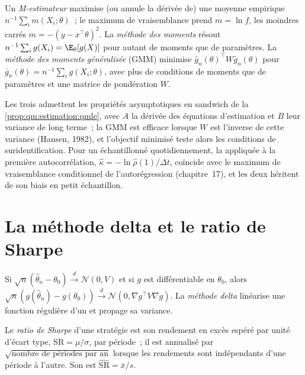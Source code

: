 \begin{definition}\label{def:qm:estimation:m}
Un \emph{M-estimateur} maximise (ou annule la dérivée de) une moyenne empirique $n^{-1}\sum_im(X_i; \theta)$~;
le maximum de vraisemblance prend $m = \ln f$, les moindres carrés $m = -(y - x^\top\theta)^2$. La \emph{méthode des
moments} résout $n^{-1}\sum_ig(X_i) = \E_\theta[g(X)]$ pour autant de moments que de paramètres. La
\emph{méthode des moments généralisée} (GMM) minimise $\bar g_n(\theta)^\top W\bar g_n(\theta)$ pour
$\bar g_n(\theta) = n^{-1}\sum_ig(X_i; \theta)$, avec plus de conditions de moments que de paramètres et une matrice de pondération $W$.
\end{definition}

Les trois admettent les propriétés asymptotiques en sandwich de la \cref{prop:qm:estimation:qmle}, avec $A$ la dérivée des équations
d'estimation et $B$ leur variance de long terme~; la GMM est efficace lorsque $W$ est l'inverse de cette variance (Hansen, 1982),
et l'objectif minimisé teste alors les conditions de suridentification. Pour un  échantillonné
quotidiennement, la  appliquée à la première autocorrélation, $\hat\kappa = -\ln\hat\rho(1)/\Delta t$, coïncide avec le
maximum de vraisemblance conditionnel de l'autorégression (chapitre~17), et les deux héritent de son biais en petit échantillon.

\section{La méthode delta et le ratio de Sharpe}

\begin{method}\label{met:qm:estimation:delta}
Si $\sqrt n(\hat\theta_n - \theta_0) \xrightarrow{d} \mathcal N(0, V)$ et si $g$ est différentiable en $\theta_0$, alors $\sqrt n(g(\hat\theta_n) - g(\theta_0))
\xrightarrow{d} \mathcal N(0, \nabla g^\top V\nabla g)$. La \emph{méthode delta} linéarise une fonction régulière d'un
 et propage sa variance.
\end{method}

\begin{definition}\label{def:qm:estimation:sharpe}
Le \emph{ratio de Sharpe} d'une stratégie est son rendement en excès espéré par unité d'écart type,
$\mathrm{SR} = \mu/\sigma$, par période~; il est annualisé par $\sqrt{\text{nombre de périodes par an}}$ lorsque les rendements sont indépendants d'une période à l'autre. Son
 est $\widehat{\mathrm{SR}} = \bar x/s$.
\end{definition}

